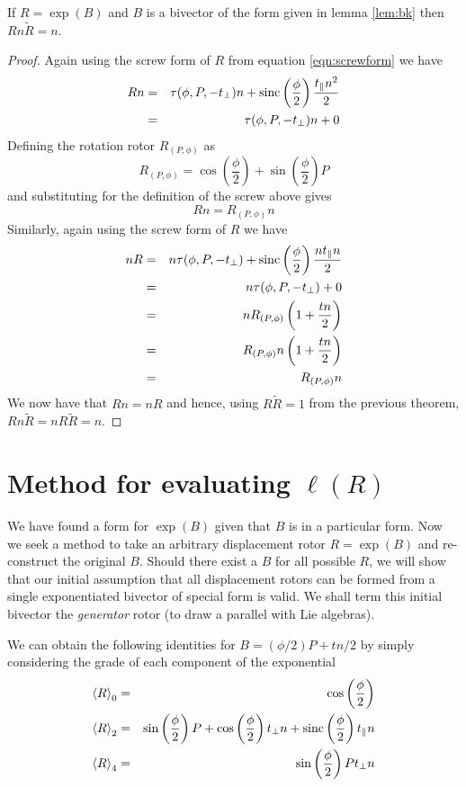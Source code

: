 \begin{thm} If $R = \exp(B)$ and $B$ is a bivector of the form 
given in lemma
\ref{lem:bk} then $Rn\tilde{R} = n$.
\end{thm}
\begin{proof}
Again using the screw form of $R$ from equation \ref{eqn:screwform} we have
\begin{eqnarray*}
Rn & = & \tau(\phi, P, - t_\perp)n + 
\mathrm{sinc}\left(\frac{\phi}{2}\right)\frac{t_\parallel n^2}{2} \\
&=& \tau(\phi, P, - t_\perp)n + 0
\end{eqnarray*}
Defining the rotation rotor $R_{(P,\phi)}$ as
\[
R_{(P,\phi)} = \cos\left(\frac{\phi}{2}\right) +
   \sin\left(\frac{\phi}{2}\right)P
\]
and substituting for the definition of the screw above gives
\[
Rn = R_{(P,\phi)} n
\]
Similarly, again using the screw form of $R$ we have
\begin{eqnarray*}
nR & = & n\tau(\phi, P, - t_\perp) + 
\mathrm{sinc}\left(\frac{\phi}{2}\right)\frac{nt_\parallel n}{2} \\
&=& n\tau(\phi, P, - t_\perp) + 0 \\
&=& n R_{(P,\phi)} \left( 1 + \frac{tn}{2} \right) \\
&=& R_{(P,\phi)} n \left( 1 + \frac{tn}{2} \right) \\
&=& R_{(P,\phi)} n 
\end{eqnarray*}
We now have that $Rn = nR$ and hence, using
$R\tilde{R} = 1$ from the previous theorem, 
$Rn\tilde{R} = nR\tilde{R} = n$.
\end{proof}

\section{Method for evaluating $\ell(R)$}

We have found a form for $\exp(B)$ given that $B$ is in a particular form.
Now we seek a method to take an arbitrary displacement
rotor $R = \exp(B)$ and re-construct the original $B$. Should there exist
a $B$ for all possible $R$, we will show that our initial assumption
that all displacement rotors can be formed from a single exponentiated bivector
of special form is valid. We shall term this initial bivector
the \emph{generator} rotor (to draw a parallel with Lie algebras).

We can obtain the following identities for $B=(\phi / 2) P + tn / 2$ by simply considering
the grade of each component of the exponential
\begin{eqnarray*}
\left< R \right>_0 & = & \cos\left(\frac{\phi}{2}\right) \\
\left< R \right>_2 & = & \sin\left(\frac{\phi}{2}\right) P + 
  \cos\left(\frac{\phi}{2}\right) t_\perp n + \mathrm{sinc}\left(\frac{\phi}{2}\right) t_\parallel n \\
\left< R \right>_4 & = & \sin\left(\frac{\phi}{2}\right) Pt_\perp n
\end{eqnarray*}

